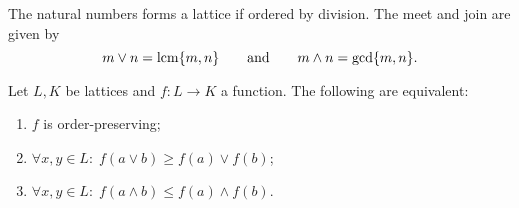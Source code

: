 \begin{lemma}
The natural numbers forms a lattice if ordered by division. The meet and join are given by
\[ m\vee n = \operatorname{lcm}\{m,n\} \qquad \text{and}\qquad m\wedge n = \gcd\{m,n\}. \]
\end{lemma}

\begin{lemma} \label{orderPreservingFunctionLatticeOperations}
Let $L,K$ be lattices and $f:L\to K$ a function. The following are equivalent:
\begin{enumerate}
\item $f$ is order-preserving;
\item $\forall x,y\in L:\; f(a\vee b)\geq f(a)\vee f(b)$;
\item $\forall x,y\in L:\; f(a\wedge b)\leq f(a)\wedge f(b)$.
\end{enumerate}
\end{lemma}

